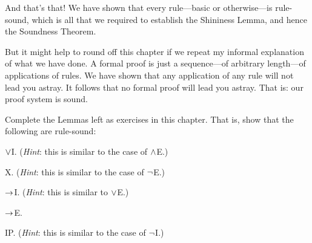 And that's that! We have shown that every rule---basic or otherwise---is rule-sound, which is all that we required to establish the Shininess Lemma, and hence the Soundness Theorem.

But it might help to round off this chapter if we repeat my informal
explanation of what we have done. A formal proof is just a
sequence---of arbitrary length---of applications of rules. We have
shown that any application of any rule will not lead you astray. It
follows that no formal proof will lead you astray.
That is: our proof system is sound.

\practiceproblems

\problempart
\label{pr.Soundness}
Complete the Lemmas left as exercises in this chapter. That is, show that the following are rule-sound:
	\begin{compactlist}
		\item $\vee$I. (\emph{Hint}: this is  similar to the case of $\wedge$E.)
		\item X. (\emph{Hint}: this is similar to the case of $\neg$E.)
		\item $\rightarrow$I. (\emph{Hint}: this is similar to $\vee$E.)
		\item $\rightarrow$E.
		\item IP. (\emph{Hint}: this is similar to the case of $\neg$I.)
	\end{compactlist}

